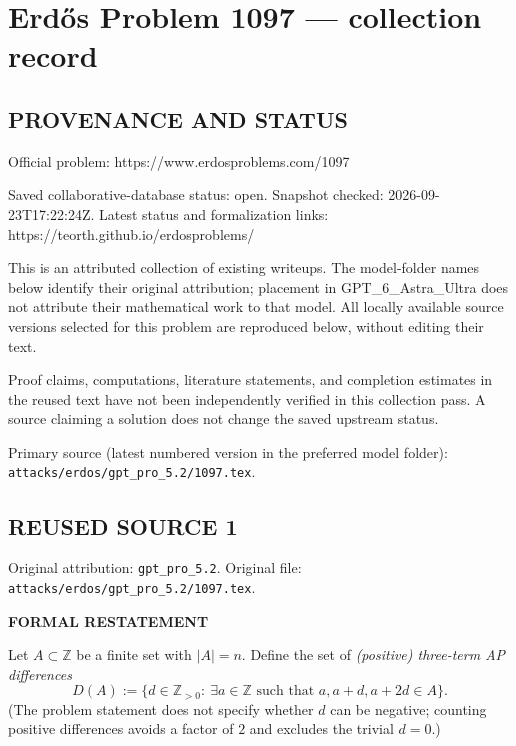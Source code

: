 \section*{Erd\H{o}s Problem 1097 --- collection record}

\subsection*{PROVENANCE AND STATUS}
Official problem: https://www.erdosproblems.com/1097

Saved collaborative-database status: open.
Snapshot checked: 2026-09-23T17:22:24Z.
Latest status and formalization links: https://teorth.github.io/erdosproblems/

This is an attributed collection of existing writeups. The model-folder names below identify their original attribution; placement in GPT\_6\_Astra\_Ultra does not attribute their mathematical work to that model. All locally available source versions selected for this problem are reproduced below, without editing their text.

Proof claims, computations, literature statements, and completion estimates in the reused text have not been independently verified in this collection pass. A source claiming a solution does not change the saved upstream status.

Primary source (latest numbered version in the preferred model folder): \texttt{attacks/erdos/gpt\_pro\_5.2/1097.tex}.

\subsection*{REUSED SOURCE 1}
Original attribution: \texttt{gpt\_pro\_5.2}.
Original file: \texttt{attacks/erdos/gpt\_pro\_5.2/1097.tex}.


\medskip
\noindent\textbf{FORMAL RESTATEMENT}

\smallskip
\noindent
Let $A\subset\mathbb{Z}$ be a finite set with $|A|=n$. Define the set of \emph{(positive) three-term AP differences}
\[
D(A):=\{d\in\mathbb{Z}_{>0}:\ \exists a\in\mathbb{Z}\text{ such that }a,a+d,a+2d\in A\}.
\]
(The problem statement does not specify whether $d$ can be negative; counting positive differences avoids a factor of $2$ and excludes the trivial $d=0$.)

